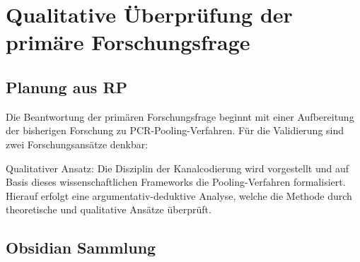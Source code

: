\chapter{Qualitative Überprüfung der primäre Forschungsfrage}

\cleardoublepage
\cleardoublepage

\section{Planung aus RP}
Die Beantwortung der primären Forschungsfrage beginnt mit einer Aufbereitung der bisherigen Forschung zu PCR-Pooling-Verfahren.
Für die Validierung sind zwei Forschungsansätze denkbar:

Qualitativer Ansatz:
Die Disziplin der Kanalcodierung wird vorgestellt und auf Basis dieses wissenschaftlichen Frameworks die Pooling-Verfahren formalisiert.
Hierauf erfolgt eine argumentativ-deduktive Analyse, welche die Methode durch theoretische und qualitative Ansätze überprüft.


\section{Obsidian Sammlung}
